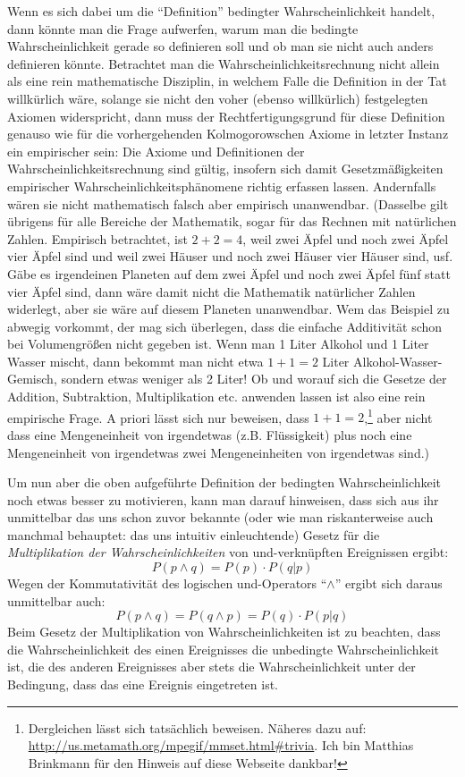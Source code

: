 Wenn es sich dabei um die "`Definition"' bedingter Wahrscheinlichkeit handelt,
dann könnte man die Frage aufwerfen, warum man die bedingte Wahrscheinlichkeit
gerade so definieren soll und ob man sie nicht auch anders definieren könnte.
Betrachtet man die Wahrscheinlichkeitsrechnung nicht allein als eine rein
mathematische Disziplin, in welchem Falle die Definition in der Tat willkürlich
wäre, solange sie nicht den voher (ebenso willkürlich) festgelegten Axiomen
widerspricht, dann muss der Rechtfertigungsgrund für diese Definition genauso wie
für die vorhergehenden Kolmogorowschen Axiome in letzter Instanz ein empirischer
sein: Die Axiome und Definitionen der Wahrscheinlichkeitsrechnung sind gültig,
insofern sich damit Gesetzmäßigkeiten empirischer Wahrscheinlichkeitsphänomene
richtig erfassen lassen. Andernfalls wären sie nicht mathematisch falsch aber
empirisch unanwendbar. (Dasselbe gilt übrigens für alle Bereiche der Mathematik,
sogar für das Rechnen mit natürlichen Zahlen. Empirisch betrachtet, ist $2+2=4$,
weil zwei Äpfel und noch zwei Äpfel vier Äpfel sind und weil zwei Häuser und noch
zwei Häuser vier Häuser sind, usf. Gäbe es irgendeinen Planeten auf dem zwei
Äpfel und noch zwei Äpfel fünf statt vier Äpfel sind, dann wäre damit nicht die
Mathematik natürlicher Zahlen widerlegt, aber sie wäre auf diesem Planeten
unanwendbar. Wem das Beispiel zu abwegig vorkommt, der mag sich überlegen, dass
die einfache Additivität schon bei Volumengrößen nicht gegeben ist. Wenn man 1
Liter Alkohol und 1 Liter Wasser mischt, dann bekommt man nicht etwa $1+1=2$
Liter Alkohol-Wasser-Gemisch, sondern etwas weniger als 2 Liter! Ob und worauf
sich die Gesetze der Addition, Subtraktion, Multiplikation etc. anwenden lassen
ist also eine rein empirische Frage. A priori lässt sich nur beweisen, dass
$1+1=2$,\footnote{Dergleichen lässt sich tatsächlich beweisen. Näheres dazu
auf: \url{http://us.metamath.org/mpegif/mmset.html\#trivia}. Ich bin Matthias
Brinkmann für den Hinweis auf diese Webseite dankbar!} aber nicht dass eine Mengeneinheit von
irgendetwas (z.B. Flüssigkeit) plus noch eine Mengeneinheit von irgendetwas zwei
Mengeneinheiten von irgendetwas sind.)

Um nun aber die oben aufgeführte Definition der bedingten Wahrscheinlichkeit noch
etwas besser zu motivieren, kann man darauf hinweisen, dass sich aus ihr
unmittelbar das uns schon zuvor bekannte (oder wie man riskanterweise auch
manchmal behauptet: das uns intuitiv einleuchtende) Gesetz für die {\em
Multiplikation der Wahrscheinlichkeiten} von und-verknüpften Ereignissen ergibt:
\[ P(p \wedge q) = P(p)\cdot P(q|p) \] Wegen der Kommutativität des logischen
und-Operators "`$\wedge$"' ergibt sich daraus unmittelbar auch: \[ P(p \wedge q) =
P(q \wedge p) = P(q)\cdot P(p|q) \] Beim Gesetz der Multiplikation von
Wahrscheinlichkeiten ist zu beachten, dass die Wahrscheinlichkeit des einen
Ereignisses die unbedingte Wahrscheinlichkeit ist, die des anderen Ereignisses
aber stets die Wahrscheinlichkeit unter der Bedingung, dass das eine Ereignis
eingetreten ist.

